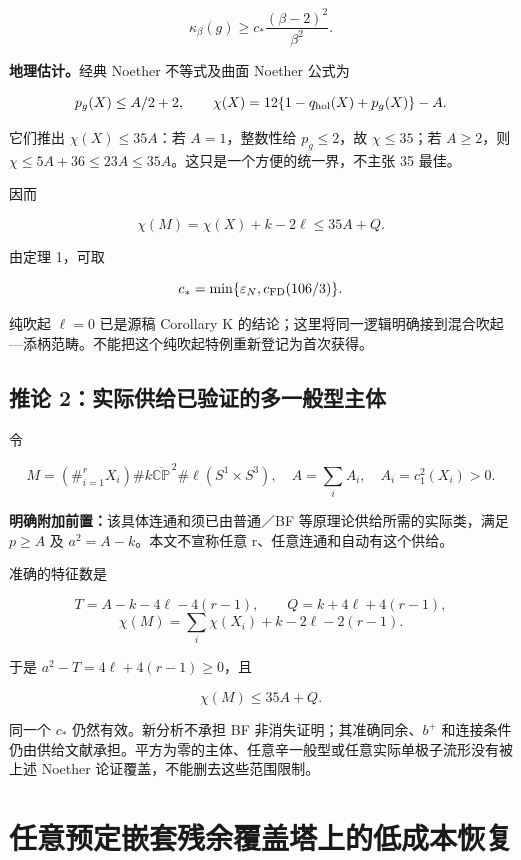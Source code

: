 \documentclass[UTF8,11pt,fontset=none]{ctexart}
\theoremstyle{definition}
\theoremstyle{remark}
\begin{document}
\[
\boxed{\kappa_\beta(g)\ge
c_*\frac{(\beta-2)^2}{\beta^2}.}
\tag{4.2.3}
\]

\textbf{地理估计。}经典 Noether 不等式及曲面 Noether 公式为

\[
p_g(X)\le A/2+2,
\qquad
\chi(X)=12\{1-q_{\rm hol}(X)+p_g(X)\}-A.
\]

它们推出 \(\chi(X)\le35A\)：若 \(A=1\)，整数性给 \(p_g\le2\)，故 \(\chi\le35\)；若 \(A\ge2\)，则 \(\chi\le5A+36\le23A\le35A\)。这只是一个方便的统一界，不主张 35 最佳。

因而

\[
\chi(M)=\chi(X)+k-2\ell\le35A+Q.
\]

由定理 1，可取

\[
c_* =\min\{\varepsilon_N,c_{\rm FD}(106/3)\}.
\]

纯吹起 \(\ell=0\) 已是源稿 Corollary K 的结论；这里将同一逻辑明确接到混合吹起---添柄范畴。不能把这个纯吹起特例重新登记为首次获得。

\subsection{推论 2：实际供给已验证的多一般型主体}\label{v4-ux63a8ux8bba-2ux5b9eux9645ux4f9bux7ed9ux5df2ux9a8cux8bc1ux7684ux591aux4e00ux822cux578bux4e3bux4f53}

令

\[
M=(\#_{i=1}^{r}X_i)\#k\overline{\mathbb{CP}}^{\,2}
\#\ell(S^1\times S^3),
\quad A=\sum_i A_i,\quad A_i=c_1^2(X_i)>0.
\]

\textbf{明确附加前置：}该具体连通和须已由普通／BF 等原理论供给所需的实际类，满足 \(p\ge A\) 及 \(a^2=A-k\)。本文不宣称任意 r、任意连通和自动有这个供给。

准确的特征数是

\[
T=A-k-4\ell-4(r-1),\qquad
Q=k+4\ell+4(r-1),
\] \[
\chi(M)=\sum_i\chi(X_i)+k-2\ell-2(r-1).
\]

于是 \(a^2-T=4\ell+4(r-1)\ge0\)，且

\[
\chi(M)\le35A+Q.
\]

同一个 \(c_*\) 仍然有效。新分析不承担 BF 非消失证明；其准确同余、\(b^+\) 和连接条件仍由供给文献承担。平方为零的主体、任意辛一般型或任意实际单极子流形没有被上述 Noether 论证覆盖，不能删去这些范围限制。

\section{任意预定嵌套残余覆盖塔上的低成本恢复}\label{v4-ux4efbux610fux9884ux5b9aux5d4cux5957ux6b8bux4f59ux8986ux76d6ux5854ux4e0aux7684ux4f4eux6210ux672cux6062ux590d}
\end{document}
